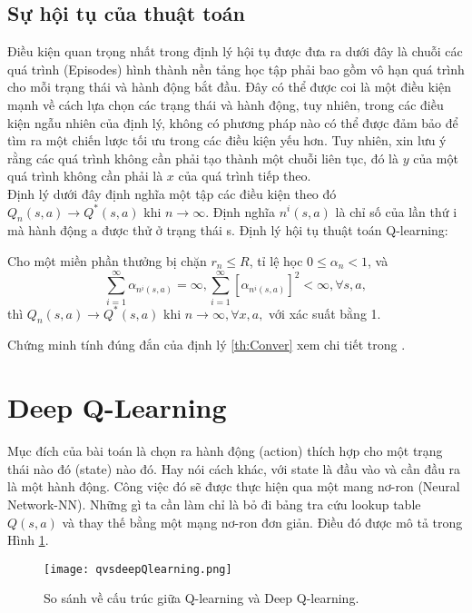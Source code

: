 \subsection{Sự hội tụ của thuật toán}
Điều kiện quan trọng nhất trong định lý hội tụ được đưa ra dưới đây là chuỗi các quá trình (Episodes) hình thành nền tảng học tập phải 
bao gồm vô hạn quá trình cho mỗi trạng thái và hành động bắt đầu. Đây có thể được coi là một điều kiện mạnh về cách lựa chọn các 
trạng thái và hành động, tuy nhiên, trong các điều kiện ngẫu nhiên của định lý, không có phương pháp nào có thể được đảm bảo 
để tìm ra một chiến lược tối ưu trong các điều kiện yếu hơn. Tuy nhiên, xin lưu ý rằng các quá trình không cần phải tạo thành một 
chuỗi liên tục, đó là $y$ của một quá trình không cần phải là $x$ của quá trình tiếp theo.\\
\indent Định lý dưới đây định nghĩa một tập các điều kiện theo đó $Q_n(s,a) \to Q^{*}(s,a)$ khi $n \to \infty$. 
Định nghĩa $n^{i}(s, a)$ là chỉ số của lần thứ i mà hành động a được thử ở trạng thái s.
Định lý hội tụ thuật toán Q-learning:
\begin{theorem}
    \label{th:Conver}
    Cho một miền phần thưởng bị chặn $r_n \leq R$, tỉ lệ học $0 \leq \alpha_n < 1$, và
    \begin{equation}
        \sum_{i=1}^{\infty}\alpha_{n^{i}(s,a)} = \infty, \sum_{i=1}^{\infty}[\alpha_{n^{i}(s,a)}]^2 < \infty, \forall s, a,
    \end{equation} 
    thì $Q_n(s,a) \to Q^{*}(s,a)$ khi $n \to \infty, \forall x, a,$ với xác suất bằng 1.
\end{theorem}
Chứng minh tính đúng đắn của định lý \ref{th:Conver} xem chi tiết trong \cite{Watkins1992}.
\section{Deep Q-Learning}
Mục đích của bài toán là chọn ra hành động (action) thích hợp cho một trạng thái nào đó (state) 
nào đó. Hay nói cách khác, với state là đầu vào và cần đầu ra là một hành động. 
Công việc đó sẽ được thực hiện qua một mang nơ-ron (Neural Network-NN). Những gì ta cần làm 
chỉ là bỏ đi  bảng tra cứu lookup table $Q(s,a)$ và thay thế bằng một mạng nơ-ron đơn giản. 
Điều đó được mô tả trong Hình \ref{fig:qlearning}.
\begin{figure}[ht]
    \centering
    \texttt{[image: qvsdeepQlearning.png]}
    \caption{So sánh về cấu trúc giữa Q-learning và Deep Q-learning.}
    \label{fig:qlearning}
\end{figure}
